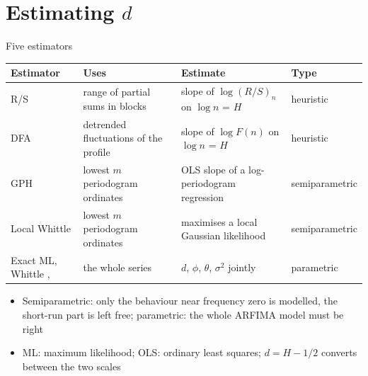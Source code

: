 \section{Estimating $d$}

\begin{frame}{Five estimators}
\itemsize{\small}
\begin{center}
\scriptsize
\begin{tabular}{>{\raggedright\arraybackslash}p{2.3cm}>{\raggedright\arraybackslash}p{3.1cm}>{\raggedright\arraybackslash}p{3.6cm}>{\raggedright\arraybackslash}p{1.9cm}}
\toprule
\textbf{Estimator} & \textbf{Uses} & \textbf{Estimate} & \textbf{Type} \\
\midrule
R/S {} & range of partial sums in blocks & slope of $\log(R/S)_n$ on $\log n$ = $H$ & heuristic \\
DFA {} & detrended fluctuations of the profile & slope of $\log F(n)$ on $\log n$ = $H$ & heuristic \\
GPH {} & lowest $m$ periodogram ordinates & OLS slope of a log-periodogram regression & semiparametric \\
Local Whittle {} & lowest $m$ periodogram ordinates & maximises a local Gaussian likelihood & semiparametric \\
Exact ML, Whittle , {} & the whole series & $d$, $\phi$, $\theta$, $\sigma^2$ jointly & parametric \\
\bottomrule
\end{tabular}
\end{center}
\begin{itemize}
    \item Semiparametric: only the behaviour near frequency zero is modelled, the short-run part is left free; parametric: the whole ARFIMA model must be right
    \item ML: maximum likelihood; OLS: ordinary least squares; $d = H - 1/2$ converts between the two scales
\end{itemize}
\end{frame}

